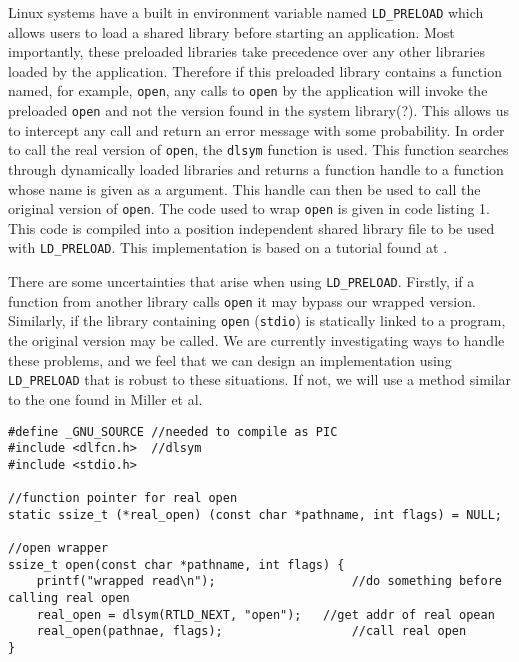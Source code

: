 \documentclass[10pt]{article}
\begin{document}
Linux systems have a built in environment variable named \texttt{LD\_PRELOAD} which allows users to load a shared library before starting an application. Most importantly, these preloaded libraries take precedence over any other libraries loaded by the application. Therefore if this preloaded library contains a function named, for example, \texttt{open}, any calls to \texttt{open} by the application will invoke the preloaded \texttt{open} and not the version found in the system library(?). This allows us to intercept any call and return an error message with some probability. In order to call the real version of \texttt{open}, the \texttt{dlsym} function is used. This function searches through dynamically loaded libraries and returns a function handle to a function whose name is given as a argument. This handle can then be used to call the original version of \texttt{open}. The code used to wrap \texttt{open} is given in code listing 1. This code is compiled into a position independent shared library file to be used with \texttt{LD\_PRELOAD}. This implementation is based on a tutorial found at \cite{preload}.

There are some uncertainties that arise when using \texttt{LD\_PRELOAD}. Firstly, if a function from another library calls \texttt{open} it may bypass our wrapped version. Similarly, if the library containing \texttt{open} (\texttt{stdio}) is statically linked to a program, the original version may be called. We are currently investigating ways to handle these problems, and we feel that we can design an implementation using \texttt{LD\_PRELOAD} that is robust to these situations. If not, we will use a method similar to the one found in Miller et al.
\pagebreak
\begin{lstlisting}[caption=\texttt{open} wrapper]
#define _GNU_SOURCE	//needed to compile as PIC
#include <dlfcn.h>	//dlsym
#include <stdio.h>

//function pointer for real open
static ssize_t (*real_open) (const char *pathname, int flags) = NULL;

//open wrapper
ssize_t open(const char *pathname, int flags) {
	printf("wrapped read\n");					//do something before calling real open
	real_open = dlsym(RTLD_NEXT, "open"); 	//get addr of real opean
	real_open(pathnae, flags);					//call real open
}
\end{lstlisting}

\end{document}
